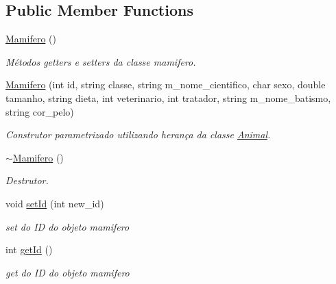 \subsection*{Public Member Functions}
\begin{DoxyCompactItemize}
\item 
\mbox{\label{class_mamifero_adc6af2531b40fb6b0bc91cb5bbb205e8}} 
\mbox{\hyperlink{class_mamifero_adc6af2531b40fb6b0bc91cb5bbb205e8}{Mamifero}} ()
\begin{DoxyCompactList}\small\item\em Métodos getters e setters da classe mamifero. \end{DoxyCompactList}\item 
\mbox{\label{class_mamifero_a600ad385c1c224d70530e4966534923e}} 
\mbox{\hyperlink{class_mamifero_a600ad385c1c224d70530e4966534923e}{Mamifero}} (int id, string classe, string m\+\_\+nome\+\_\+cientifico, char sexo, double tamanho, string dieta, int veterinario, int tratador, string m\+\_\+nome\+\_\+batismo, string cor\+\_\+pelo)
\begin{DoxyCompactList}\small\item\em Construtor parametrizado utilizando herança da classe \mbox{\hyperlink{class_animal}{Animal}}. \end{DoxyCompactList}\item 
\mbox{\label{class_mamifero_a56eb196d45222e754eb6f19000667d5d}} 
\mbox{\hyperlink{class_mamifero_a56eb196d45222e754eb6f19000667d5d}{$\sim$\+Mamifero}} ()
\begin{DoxyCompactList}\small\item\em Destrutor. \end{DoxyCompactList}\item 
void \mbox{\hyperlink{class_mamifero_a7c56e8b89fdbeb2af5c886f636229f21}{set\+Id}} (int new\+\_\+id)
\begin{DoxyCompactList}\small\item\em set do ID do objeto mamifero \end{DoxyCompactList}\item 
int \mbox{\hyperlink{class_mamifero_a250ae71fe8447cef6b358c12d155faeb}{get\+Id}} ()
\begin{DoxyCompactList}\small\item\em get do ID do objeto mamifero \end{DoxyCompactList}\item 

\end{DoxyCompactItemize}
